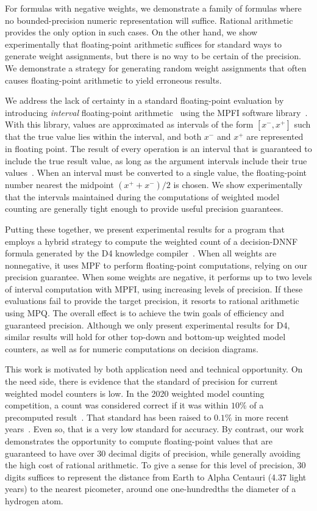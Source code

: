 \documentclass[letterpaper,USenglish,cleveref, autoref, thm-restate]{lipics-v2021}
\newcommand{\xmin}{x^{-}}
\newcommand{\xmax}{x^{+}}
\begin{document}
For formulas with negative weights, we demonstrate a family of
formulas where no bounded-precision numeric representation will
suffice.  Rational arithmetic provides the only option in such cases.
On the other hand, we show experimentally that floating-point
arithmetic suffices for standard ways to generate weight assignments,
but there is no way to be certain of the precision.  We
demonstrate a strategy for generating random weight assignments that
often causes floating-point arithmetic to yield erroneous results.

We address the lack of certainty in a standard floating-point
evaluation by introducing \emph{interval} floating-point
arithmetic~\cite{hickey:jacm:2001} using the MPFI software
library~\cite{revol:rc:2005}. With this library, values are
approximated as intervals of the form $[\xmin, \xmax]$ such that the
true value lies within the interval, and both $\xmin$ and $\xmax$ are
represented in floating point.  The result of every operation is an
interval that is guaranteed to include the true result value, as long
as the argument intervals include their true values~\cite{hickey:jacm:2001,muller:hfpa:2018}.
When an interval must be converted to a single value, the floating-point number nearest the midpoint $(\xmax+\xmin)/2$ is chosen.
We show
experimentally that the intervals maintained during the computations
of weighted model counting are generally tight enough to provide
useful precision guarantees.

Putting these together, we present experimental results for a program
that employs a hybrid strategy to compute the weighted count of a decision-DNNF formula
generated by the D4 knowledge compiler~\cite{lagniez:ijcai:2017}.
When all weights are nonnegative, it uses MPF to
perform floating-point computations, relying on our precision
guarantee.  When some weights are negative, it performs up to two
levels of interval computation with MPFI, using increasing levels of
precision.  If these evaluations fail to provide the target precision,
it resorts to rational arithmetic using MPQ\@.  The overall effect
is to achieve the twin goals of efficiency and guaranteed precision.
Although we only present experimental results for D4, similar results will hold for other top-down and bottom-up weighted model counters, as well as
for numeric computations on decision diagrams.

This work is motivated by both application need and technical
opportunity.  On the need side, there is evidence that the standard of
precision for current weighted model counters is low.  In the 2020
weighted model counting competition, a count was considered correct if
it was within $10\%$ of a precomputed result~\cite{fichte:jea:2020}.
That standard has been raised to $0.1\%$ in more recent
years~\cite{hecher:mc:2024}.  Even so, that is a very low standard for
accuracy.  By contrast, our work demonstrates the opportunity to
compute floating-point values that are guaranteed to have over 30 decimal
digits of precision, while generally avoiding the high cost of
rational arithmetic.  To give a sense for this level of precision,
30 digits suffices to represent the distance from
Earth to Alpha Centauri (4.37 light years) to the nearest picometer,
around one one-hundredths the diameter of a hydrogen atom.
\end{document}
